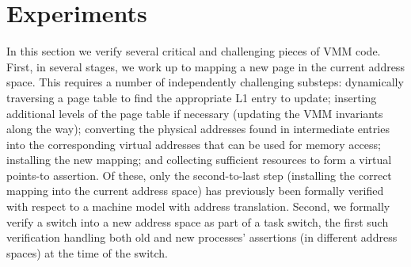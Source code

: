 \section{Experiments}
\label{sec:experiment}
In this section we verify several critical and challenging pieces of VMM code.
First, in several stages, we work up to mapping a new page in the current address space.
This requires a number of independently challenging substeps: dynamically traversing a page table to find
the appropriate L1 entry to update; inserting additional levels of the page table if necessary (updating
the VMM invariants along the way);
converting the physical addresses found in intermediate entries into the corresponding virtual addresses
that can be used for memory access;
installing the new mapping;
and collecting sufficient resources to form a virtual points-to assertion.
Of these, only the second-to-last step (installing the correct mapping into the
current address space) has previously been formally verified with respect to a machine model with address translation.
Second, we formally verify a switch into a new address space as part of a task switch,
the first such verification handling both old and new processes' assertions (in different address spaces) at the time of the switch.

